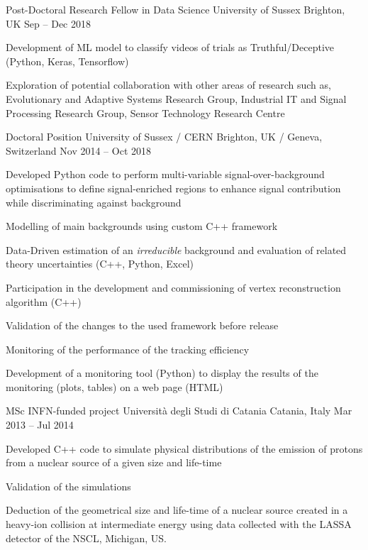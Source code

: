 \newpage

  \begin{cventries}
    \cventry
    {Post-Doctoral Research Fellow in Data Science}
    {University of Sussex}
    {Brighton, UK}
    {Sep -- Dec 2018}
    {
      \begin{cvitems}
        \item Development of ML model to classify videos of trials as Truthful/Deceptive (Python, Keras, Tensorflow)
        \item Exploration of potential collaboration with other areas of research such as, Evolutionary and Adaptive Systems Research Group, Industrial IT and Signal Processing Research Group, Sensor Technology Research Centre
      \end{cvitems}
    }
  \end{cventries}

  \begin{cventries}    
    \cventry
    {Doctoral Position}
    {University of Sussex / CERN}
    {Brighton, UK / Geneva, Switzerland}
    {Nov 2014 -- Oct 2018}
    {
    \begin{cvitems}
      \item Developed Python code to perform multi-variable signal-over-background optimisations to define signal-enriched regions to enhance signal contribution while discriminating against background
      \item Modelling of main backgrounds using custom C++ framework
      \item Data-Driven estimation of an \emph{irreducible} background and evaluation of related theory uncertainties (C++, Python, Excel)
      \item Participation in the development and commissioning of vertex reconstruction algorithm (C++)
      \item Validation of the changes to the used framework before release
      \item Monitoring of the performance of the tracking efficiency
      \item Development of a monitoring tool (Python) to display the results of the monitoring (plots, tables) on a web page (HTML)
    \end{cvitems}
    }
  \end{cventries}

  \begin{cventries}    
    \cventry
    {MSc INFN-funded project}
    {Università degli Studi di Catania}
    {Catania, Italy}
    {Mar 2013 -- Jul 2014}
    {
    \begin{cvitems}
      \item Developed C++ code to simulate physical distributions of the emission of protons from a nuclear source of a given size and life-time
      \item Validation of the simulations
      \item Deduction of the geometrical size and life-time of a nuclear source created in a heavy-ion collision at intermediate energy using data collected with the LASSA detector of the NSCL, Michigan, US.
    \end{cvitems}
    }
  \end{cventries}
